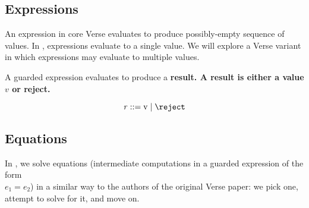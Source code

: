 \documentclass[]{article}
\begin{document}
    \medskip
    

    
    
    
    
    
    

    
    \subsection{Expressions}
    
    \newcommand\GNoTree{\vmrung \rightsquigarrow \uppsidown} 
    
    An expression in core Verse evaluates to produce possibly-empty sequence of
    values. In \VMinus, expressions evaluate to a single value. We will explore
    a Verse variant in which expressions may evaluate to multiple values. 

    

    A guarded expression evaluates to produce a \bf{result}. A result is either
    a value $v$ or reject. 
    
    \[\it{r} \; \rm{::=} \; v \;|\; \reject \]
    
    
    
    \bigskip
\subsection{Equations}

In \VMinus, we solve equations (intermediate computations in a guarded
expression of the form \\$e_{1} = e_{2}$) in a similar way to the
authors of the original Verse paper: we pick one, attempt to solve for it, and
move on. 
\end{document}
